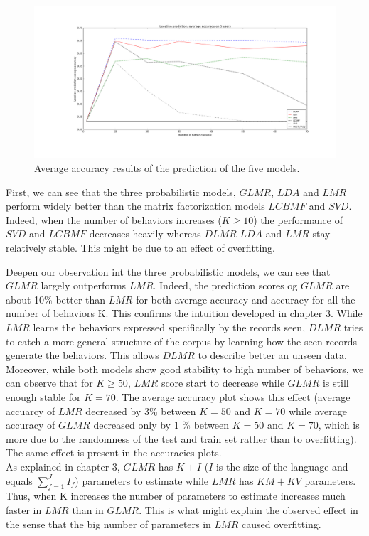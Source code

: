 \begin{figure} [!ht]
\caption{Average accuracy results of the prediction of the five models.}
\label{avacc}
\includegraphics[scale=0.3]{Figures/location_average_accuracy.png}
\end{figure}

First, we can see that the three probabilistic models, $GLMR$, $LDA$ and $LMR$ perform widely better than the matrix factorization models $LCBMF$ and $SVD$.
\\Indeed, when the number of behaviors increases ($K\geqslant 10$) the performance of $SVD$ and $LCBMF$ decreases heavily whereas $DLMR$ $LDA$ and $LMR$ stay relatively stable. This might be due to an effect of overfitting. \par

Deepen our observation int the three probabilistic models, we can see that $GLMR$ largely outperforms $LMR$. Indeed, the prediction scores og $GLMR$ are about 10\% better than $LMR$ for both average accuracy and accuracy for all the number of behaviors K. This confirms the intuition developed in chapter 3. While $LMR$ learns the behaviors expressed specifically by the records seen, $DLMR$ tries to catch a more general structure of the corpus by learning how the seen records generate the behaviors. This allows $DLMR$ to describe better an unseen data. Moreover, while both models show good stability to high number of behaviors, we can observe that for $K\geqslant 50$, $LMR$ score start to decrease while $GLMR$ is still enough stable for  $K=70$. The average accuracy plot shows this effect (average accuarcy of $LMR$ decreased by 3\% between $K = 50$ and $K = 70$ while average accuracy of $GLMR$ decreased only by 1 \% between $K = 50$ and $K = 70$, which is more due to the randomness of the test and train set rather than to overfitting). The same effect is present in the accuracies plots. 
\\As explained in chapter 3, $GLMR$ has $K+I$ ($I$ is the size of the language and equals $\sum_{f=1}^{J} I_f$) parameters to estimate while $LMR$ has $KM + KV$ parameters. Thus, when K increases the number of parameters to estimate increases much faster in $LMR$ than in $GLMR$. This is what might explain the observed effect in the sense that the big number of parameters in $LMR$ caused overfitting. \par

